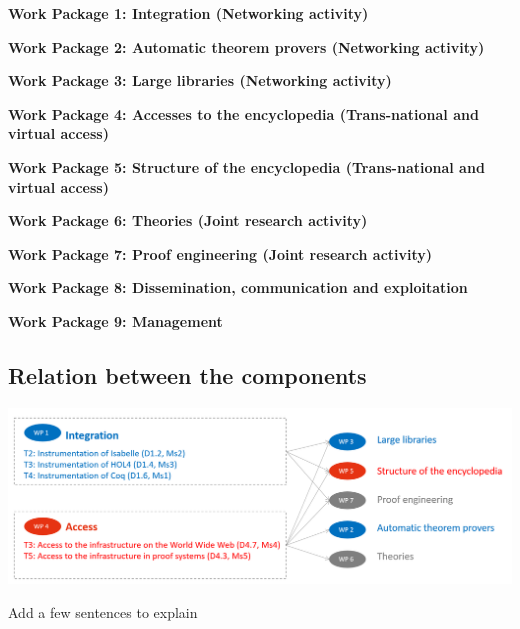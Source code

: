 \begin{workplan}


  \newcommand\na{(Networking activity)}
  \newcommand\tnva{(Trans-national and virtual access)}
  \newcommand\jra{(Joint research activity)}
  \newcommand\titlewp[3]{\bigskip\noindent\colorbox{color3}{\begin{minipage}\textwidth\bf Work Package #1: #2\end{minipage}}}

\titlewp{1}{Integration \na}{instrumentation}

\titlewp{2}{Automatic theorem provers \na}{atpetc}

\titlewp{3}{Large libraries \na}{libraries}

\titlewp{4}{Accesses to the encyclopedia \tnva}{access}

\titlewp{5}{Structure of the encyclopedia \tnva}{structuring}

\titlewp{6}{Theories \jra}{theories}

\titlewp{7}{Proof engineering \jra}{alignment}

\titlewp{8}{Dissemination, communication and exploitation}{dissemination}

\titlewp{9}{Management}{management}

\end{workplan}



\subsection{Relation between the components}

\includegraphics[width=\textwidth]{img/PERT}


{\color{red} Add a few sentences to explain}

